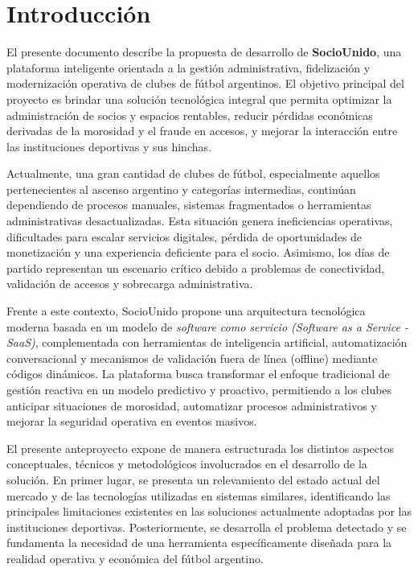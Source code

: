 \section{Introducción}

El presente documento describe la propuesta de desarrollo de \textbf{SocioUnido}, una plataforma inteligente orientada a la gestión administrativa, fidelización y modernización operativa de clubes de fútbol argentinos. El objetivo principal del proyecto es brindar una solución tecnológica integral que permita optimizar la administración de socios y espacios rentables, reducir pérdidas económicas derivadas de la morosidad y el fraude en accesos, y mejorar la interacción entre las instituciones deportivas y sus hinchas.

Actualmente, una gran cantidad de clubes de fútbol, especialmente aquellos pertenecientes al ascenso argentino y categorías intermedias, continúan dependiendo de procesos manuales, sistemas fragmentados o herramientas administrativas desactualizadas. Esta situación genera ineficiencias operativas, dificultades para escalar servicios digitales, pérdida de oportunidades de monetización y una experiencia deficiente para el socio. Asimismo, los días de partido representan un escenario crítico debido a problemas de conectividad, validación de accesos y sobrecarga administrativa.

Frente a este contexto, SocioUnido propone una arquitectura tecnológica moderna basada en un modelo de \textit{software como servicio (Software as a Service - SaaS)}, complementada con herramientas de inteligencia artificial, automatización conversacional y mecanismos de validación fuera de línea (offline) mediante códigos dinámicos. La plataforma busca transformar el enfoque tradicional de gestión reactiva en un modelo predictivo y proactivo, permitiendo a los clubes anticipar situaciones de morosidad, automatizar procesos administrativos y mejorar la seguridad operativa en eventos masivos.

El presente anteproyecto expone de manera estructurada los distintos aspectos conceptuales, técnicos y metodológicos involucrados en el desarrollo de la solución. En primer lugar, se presenta un relevamiento del estado actual del mercado y de las tecnologías utilizadas en sistemas similares, identificando las principales limitaciones existentes en las soluciones actualmente adoptadas por las instituciones deportivas. Posteriormente, se desarrolla el problema detectado y se fundamenta la necesidad de una herramienta específicamente diseñada para la realidad operativa y económica del fútbol argentino.

